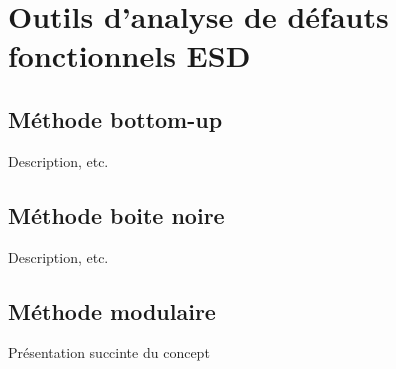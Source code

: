 \chapter{Outils d'analyse de défauts fonctionnels ESD}
\label{chap:4}
\section{Méthode bottom-up}

Description, etc.

\section{Méthode boite noire}

Description, etc.

\section{Méthode modulaire}

Présentation succinte du concept
